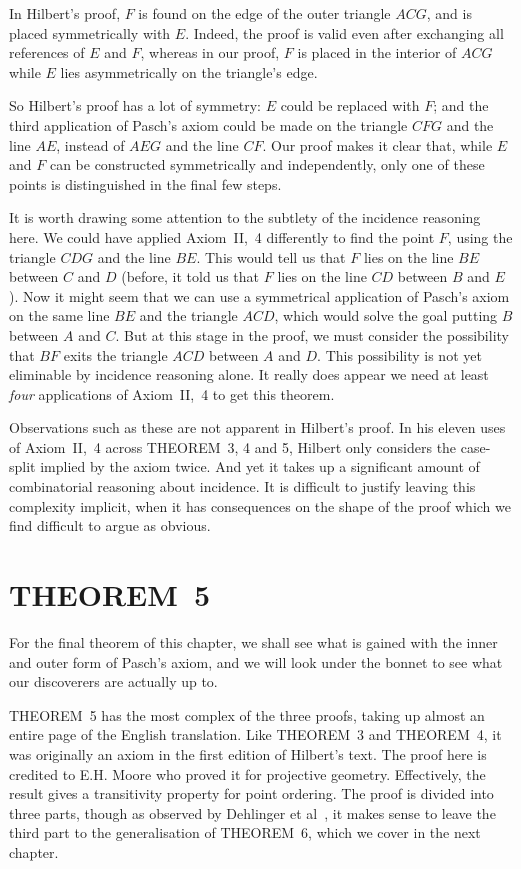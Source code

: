 In Hilbert's proof, $F$ is found on the edge of the outer triangle $ACG$, and is placed symmetrically with $E$. Indeed, the proof is valid even after exchanging all references of $E$ and $F$, whereas in our proof, $F$ is placed in the interior of $ACG$ while $E$ lies asymmetrically on the triangle's edge. 

So Hilbert's proof has a lot of symmetry: $E$ could be replaced with $F$; and the third application of Pasch's axiom could be made on the triangle $CFG$ and the line $AE$, instead of $AEG$ and the line $CF$. Our proof makes it clear that, while $E$ and $F$ can be constructed symmetrically and independently, only one of these points is distinguished in the final few steps. 

It is worth drawing some attention to the subtlety of the incidence reasoning here. We could have applied Axiom~II,~4 differently to find the point $F$, using the triangle $CDG$ and the line $BE$. This would tell us that $F$ lies on the line $BE$ between $C$ and $D$ (before, it told us that $F$ lies on the line $CD$ between $B$ and $E$). Now it might seem that we can use a symmetrical application of Pasch's axiom on the same line $BE$ and the triangle $ACD$, which would solve the goal putting $B$ between $A$ and $C$. But at this stage in the proof, we must consider the possibility that $BF$ exits the triangle $ACD$ between $A$ and $D$. This possibility is not yet eliminable by incidence reasoning alone. It really does appear we need at least \emph{four} applications of Axiom~II,~4 to get this theorem.

Observations such as these are not apparent in Hilbert's proof. In his eleven uses of Axiom~II,~4 across THEOREM~3, 4 and 5, Hilbert only considers the case-split implied by the axiom twice. And yet it takes up a significant amount of combinatorial reasoning about incidence. It is difficult to justify leaving this complexity implicit, when it has consequences on the shape of the proof which we find difficult to argue as obvious. 

\section{THEOREM~5}\label{sec:Theorem5}
For the final theorem of this chapter, we shall see what is gained with the inner and outer form of Pasch's axiom, and we will look under the bonnet to see what our discoverers are actually up to.

THEOREM~5 has the most complex of the three proofs, taking up almost an entire page of the English translation. Like THEOREM~3 and THEOREM~4, it was originally an axiom in the first edition of Hilbert's text. The proof here is credited to E.H. Moore who proved it for projective geometry. Effectively, the result gives a transitivity property for point ordering. The proof is divided into three parts, though as observed by Dehlinger et al~\cite{DehlingerFOG}, it makes sense to leave the third part to the generalisation of THEOREM~6, which we cover in the next chapter.

